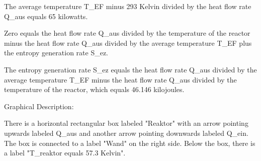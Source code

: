 The average temperature T_EF minus 293 Kelvin divided by the heat flow rate Q_aus equals 65 kilowatts.

Zero equals the heat flow rate Q_aus divided by the temperature of the reactor minus the heat flow rate Q_aus divided by the average temperature T_EF plus the entropy generation rate S_ez.

The entropy generation rate S_ez equals the heat flow rate Q_aus divided by the average temperature T_EF minus the heat flow rate Q_aus divided by the temperature of the reactor, which equals 46.146 kilojoules.

Graphical Description:

There is a horizontal rectangular box labeled "Reaktor" with an arrow pointing upwards labeled Q_aus and another arrow pointing downwards labeled Q_ein. The box is connected to a label "Wand" on the right side. Below the box, there is a label "T_reaktor equals 57.3 Kelvin".